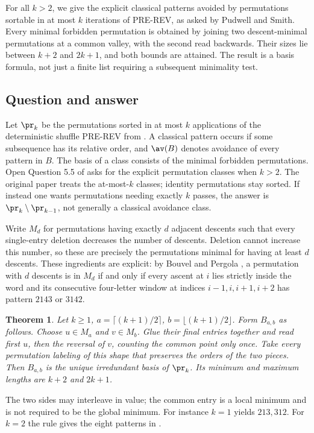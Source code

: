 \documentclass[11pt,a4paper]{article}
\numberwithin{equation}{section}
\newtheorem{theorem}{Theorem}[section]
\theoremstyle{definition}
\theoremstyle{remark}
\newenvironment{sectionabstract}{\par\smallskip\begingroup\small\noindent}{\par\endgroup\medskip}
\begin{document}
\begin{sectionabstract}
For all $k>2$, we give the explicit classical patterns avoided by permutations sortable in at most $k$ iterations of PRE-REV, as asked by Pudwell and Smith. Every minimal forbidden permutation is obtained by joining two descent-minimal permutations at a common valley, with the second read backwards. Their sizes lie between $k+2$ and $2k+1$, and both bounds are attained. The result is a basis formula, not just a finite list requiring a subsequent minimality test.
\end{sectionabstract}
\subsection{Question and answer}
Let $\pr_k$ be the permutations sorted in at most $k$ applications of the deterministic shuffle PRE-REV from \cite{r33reiwa:PS}. A classical pattern occurs if some subsequence has its relative order, and $\av(B)$ denotes avoidance of every pattern in $B$. The basis of a class consists of the minimal forbidden permutations. Open Question 5.5 of \cite{r33reiwa:PS} asks for the explicit permutation classes when $k>2$. The original paper treats the at-most-$k$ classes; identity permutations stay sorted. If instead one wants permutations needing exactly $k$ passes, the answer is $\pr_k\setminus\pr_{k-1}$, not generally a classical avoidance class.

Write $M_d$ for permutations having exactly $d$ adjacent descents such that every single-entry deletion decreases the number of descents. Deletion cannot increase this number, so these are precisely the permutations minimal for having at least $d$ descents. These ingredients are explicit: by Bouvel and Pergola \cite[Thm.~3]{r33reiwa:BP}, a permutation with $d$ descents is in $M_d$ if and only if every ascent at $i$ lies strictly inside the word and its consecutive four-letter window at indices $i-1,i,i+1,i+2$ has pattern $2143$ or $3142$.

\begin{theorem}\label{r33reiwa:T}
Let $k\ge1$, $a=\lceil(k+1)/2\rceil$, $b=\lfloor(k+1)/2\rfloor$. Form $B_{a,b}$ as follows. Choose $u\in M_a$ and $v\in M_b$. Glue their final entries together and read first $u$, then the reversal of $v$, counting the common point only once. Take every permutation labeling of this shape that preserves the orders of the two pieces. Then $B_{a,b}$ is the unique irredundant basis of $\pr_k$. Its minimum and maximum lengths are $k+2$ and $2k+1$.
\end{theorem}
The two sides may interleave in value; the common entry is a local minimum and is not required to be the global minimum. For instance $k=1$ yields $213,312$. For $k=2$ the rule gives the eight patterns in \cite[Prop.~4.1]{r33reiwa:PS}.
\end{document}
